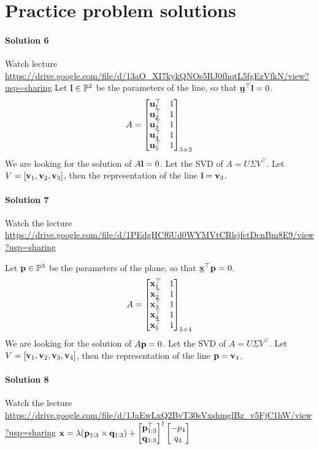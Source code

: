 \documentclass{article}
\begin{document}
\newpage
\section*{Practice problem solutions}
\paragraph*{Solution 6}
Watch lecture \url{https://drive.google.com/file/d/13aO_XI7kykQNOs5RJ0fhqtL5fgEzVfkN/view?usp=sharing}
Let $\mathbf{l} \in \mathbb{P}^2$  be the parameters of the line, so that $\underline{\mathbf{u}}^\top \mathbf{l} = 0$.
\begin{align*}
  A = \begin{bmatrix}
    \mathbf{u}_1^\top & 1 \\
    \mathbf{u}_2^\top & 1\\
    \mathbf{u}_3^\top & 1\\
    \mathbf{u}_4^\top & 1\\
    \mathbf{u}_5^\top & 1
    \end{bmatrix}_{5 \times 3}
\end{align*}
We are looking for the solution of $A \mathbf{l} = 0$.
Let the SVD of $A = U\Sigma V^\top$. Let $V = [\mathbf{v}_1, \mathbf{v}_2, \mathbf{v}_3]$, then
the representation of the line $\mathbf{l} = \mathbf{v}_3$.

\paragraph*{Solution 7}

Watch the lecture \url{https://drive.google.com/file/d/1PEdgHCf6Ud0WYMVtCRlsjfctDcnBm8E9/view?usp=sharing}

Let $\mathbf{p} \in \mathbb{P}^3$  be the parameters of the plane, so that $\underline{\mathbf{x}}^\top \mathbf{p} = 0$.
\begin{align*}
  A = \begin{bmatrix}
    \mathbf{x}_1^\top & 1 \\
    \mathbf{x}_2^\top & 1\\
    \mathbf{x}_3^\top & 1\\
    \mathbf{x}_4^\top & 1\\
    \mathbf{x}_5^\top & 1
  \end{bmatrix}_{5 \times 4}
\end{align*}
We are looking for the solution of $A \mathbf{p} = 0$.
Let the SVD of $A = U\Sigma V^\top$. Let $V = [\mathbf{v}_1, \mathbf{v}_2, \mathbf{v}_3, \mathbf{v}_4]$, then
the representation of the line $\mathbf{p} = \mathbf{v}_4$.
\paragraph*{Solution 8}
Watch the lecture \url{https://drive.google.com/file/d/1JaEwLxQ2BvT30sVxshmglBz_v5FjC1hW/view?usp=sharing}
$\mathbf{x} = \lambda (\mathbf{p}_{1:3} \times \mathbf{q}_{1:3}) + \begin{bmatrix} \mathbf{p}_{1:3}^\top
  \\ \mathbf{q}_{1:3}\end{bmatrix}^\dagger \begin{bmatrix}-p_4 \\ q_4 \end{bmatrix}$
\end{document}
